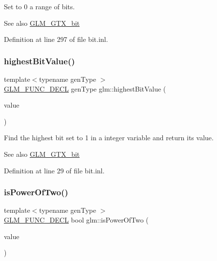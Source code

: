 Set to 0 a range of bits. \begin{DoxySeeAlso}{See also}
\hyperlink{group__gtx__bit}{G\+L\+M\+\_\+\+G\+T\+X\+\_\+bit} 
\end{DoxySeeAlso}


Definition at line 297 of file bit.\+inl.

\mbox{\label{group__gtx__bit_ga9621840252c293918780bc3890374b86}} 
\subsubsection{\texorpdfstring{highest\+Bit\+Value()}{highestBitValue()}}
{\footnotesize\ttfamily template$<$typename gen\+Type $>$ \\
\hyperlink{setup_8hpp_ab2d052de21a70539923e9bcbf6e83a51}{G\+L\+M\+\_\+\+F\+U\+N\+C\+\_\+\+D\+E\+CL} gen\+Type glm\+::highest\+Bit\+Value (\begin{DoxyParamCaption}\item[{gen\+Type const \&}]{value }\end{DoxyParamCaption})}

Find the highest bit set to 1 in a integer variable and return its value. \begin{DoxySeeAlso}{See also}
\hyperlink{group__gtx__bit}{G\+L\+M\+\_\+\+G\+T\+X\+\_\+bit} 
\end{DoxySeeAlso}


Definition at line 29 of file bit.\+inl.

\mbox{\label{group__gtx__bit_ga5ddca7546d8be35992eedd3411842545}} 
\subsubsection{\texorpdfstring{is\+Power\+Of\+Two()}{isPowerOfTwo()}}
{\footnotesize\ttfamily template$<$typename gen\+Type $>$ \\
\hyperlink{setup_8hpp_ab2d052de21a70539923e9bcbf6e83a51}{G\+L\+M\+\_\+\+F\+U\+N\+C\+\_\+\+D\+E\+CL} bool glm\+::is\+Power\+Of\+Two (\begin{DoxyParamCaption}\item[{gen\+Type const \&}]{value }\end{DoxyParamCaption})}

